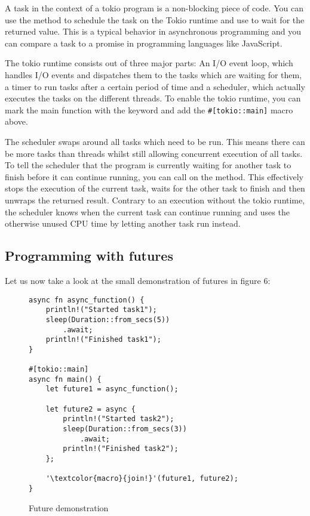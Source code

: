 A task in the context of a tokio program is a non-blocking piece of code. You can use the 
method to schedule the task on the Tokio runtime and use  to wait for the returned value. This is a typical
behavior in asynchronous programming and you can compare a task to a promise in programming languages like JavaScript.

The tokio runtime consists out of three major parts: An I/O event loop, which handles I/O events and dispatches them to
the tasks which are waiting for them, a timer to run tasks after a certain period of time and  a scheduler, which
actually executes the tasks on the different threads. To enable the tokio runtime, you can mark the main function with
the  keyword and add the \texttt{#[tokio::main]} macro above.

The scheduler swaps around all tasks which need to be run. This means there can be more tasks than threads whilst still
allowing concurrent execution of all tasks. To tell the scheduler that the program is currently waiting for another
task to finish before it can continue running, you can call  on the method. This effectively stops the
execution of the current task, waits for the other task to finish and then unwraps the returned result. Contrary to an
execution without the tokio runtime, the scheduler knows when the current task can continue running and uses the
otherwise unused CPU time by letting another task run instead.

\subsection{Programming with futures}
Let us now take a look at the small demonstration of futures in figure 6:

\begin{figure}[ht]
    \begin{verbatim}
async fn async_function() {
    println!("Started task1");
    sleep(Duration::from_secs(5))
        .await;
    println!("Finished task1");
}

#[tokio::main]
async fn main() {
    let future1 = async_function();

    let future2 = async {
        println!("Started task2");
        sleep(Duration::from_secs(3))
            .await;
        println!("Finished task2");
    };

    '\textcolor{macro}{join!}'(future1, future2);
}
    \end{verbatim}
    \caption{Future demonstration}
\end{figure}

